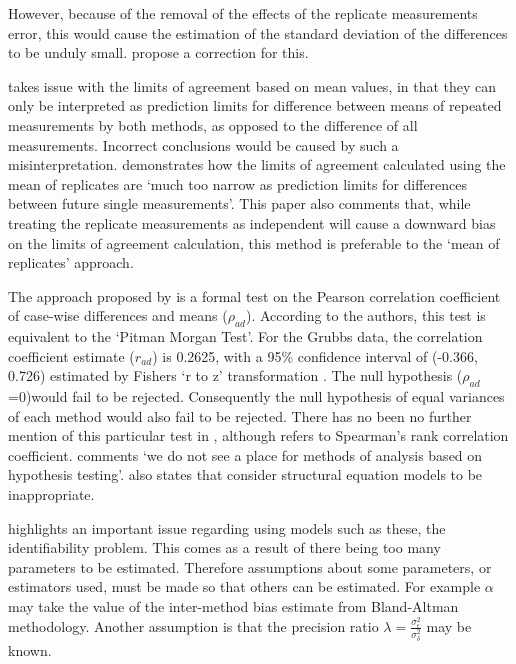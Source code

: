 \documentclass[12pt, a4paper]{report}
\begin{document}
	
	However, because of the removal of the effects of the replicate	measurements error, this would cause the estimation of the
	standard deviation of the differences to be unduly small.
	\citet*{BA86} propose a correction for this.
	
	\citet{BXC2008} takes issue with the limits of agreement based on
	mean values, in that they can only be interpreted as prediction
	limits for difference between means of repeated measurements by
	both methods, as opposed to the difference of all measurements.
	Incorrect conclusions would be caused by such a misinterpretation.
	\citet{BXC2008} demonstrates how the limits of agreement
	calculated using the mean of replicates are `much too narrow as
	prediction limits for differences between future single
	measurements'. This paper also comments that, while treating the
	replicate measurements as independent will cause a downward bias
	on the limits of agreement calculation, this method is preferable
	to the `mean of replicates' approach.
	
	The approach proposed by \citet{BA83} is a formal test on the Pearson correlation coefficient of case-wise differences and means
	($\rho_{ad}$). According to the authors, this test is equivalent
	to the `Pitman Morgan Test'. For the Grubbs data, the correlation
	coefficient estimate ($r_{ad}$) is 0.2625, with a 95\% confidence
	interval of (-0.366, 0.726) estimated by Fishers `r to z'
	transformation \citep*{Cohen}. The null hypothesis ($\rho_{ad}$
	=0)would fail to be rejected. Consequently the null hypothesis of
	equal variances of each method would also fail to be rejected.
	There has no been no further mention of this particular test in
	\citet{BA86}, although \citet{BA99} refers to Spearman's rank
	correlation coefficient. \citet{BA99} comments `we do not see a
	place for methods of analysis based on hypothesis testing'.
	\citet{BA99} also states that consider structural equation models
	to be inappropriate.
	
	\citet{DunnSEME} highlights an important issue regarding using
	models such as these, the identifiability problem. This comes as a
	result of there being too many parameters to be estimated.
	Therefore assumptions about some parameters, or estimators used,
	must be made so that others can be estimated. For example $\alpha$
	may take the value of the inter-method bias estimate from
	Bland-Altman methodology. Another assumption is that the precision
	ratio $\lambda=\frac{\sigma^{2}_{\epsilon}}{\sigma^{2}_{\delta}}$
	may be known.
	
\end{document}
